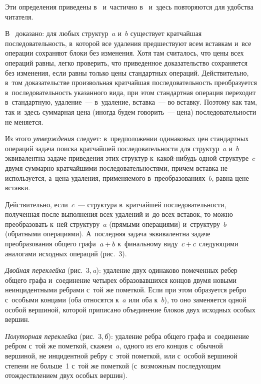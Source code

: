 \begin{multicols}{2}
  Эти определения приведены в~\cite{2-gor, 3-gor} и~частично в~\cite{6-gor} 
и~здесь повторяются для удобства читателя. 
  
  В~\cite{2-gor} доказано: для любых структур~$a$ и~$b$ существует 
кратчайшая последовательность, в~которой все удаления предшествуют всем 
вставкам и~все операции сохраняют блоки без изменения. Хотя там считалось, 
что цены всех операций равны, легко проверить, что приведенное 
доказательство сохраняется без изменения, если равны только цены\linebreak 
стандартных операций. Действительно, в~том доказательстве произвольная 
кратчайшая последовательность преобразуется в~последовательность 
указанного вида, при этом стандартная операция перехо\-дит в~стандартную, 
удаление~--- в~удаление, вставка~--- во вставку. Поэтому как там, так и~здесь 
суммарная цена (иногда будем говорить~--- цена) последовательности не 
меняется.


  
  Из этого \textit{утверждения} следует: в~предположении одинаковых цен 
стандартных операций задача поиска кратчайшей последовательности для 
структур~$a$ и~$b$ эквивалентна задаче приведения этих структур  
к~ка\-кой-ни\-будь одной структуре~$c$ двумя суммарно кратчайшими 
последовательностями, причем вставка не используется, а~цена удаления, 
применяемого в~преобразованиях~$b$, равна цене вставки. 

Действительно, 
если~$c$~--- структура в~кратчайшей последовательности, полученная после 
выполнения всех удалений и~до всех вставок, то можно преобразовать к~ней 
структуру~$a$ (прямыми операциями) и~структуру~$b$ (обратными 
операциями). А~последняя задача эквивалентна задаче преобразования общего 
графа~$a\hm+b$ к~финальному виду~$c\hm+c$ следующими аналогами 
исходных операций (рис.~3).
  

  
  \textit{Двойная переклейка} (рис.~3,\,\textit{a}): удаление двух одинаково 
помеченных ребер общего графа и~соединение четырех образовавшихся концов 
двумя новыми неинцидентными реб\-ра\-ми с~той же пометкой. Если при этом 
образуется ребро с~особыми концами (оба относятся к~$a$ или оба к~$b$), то 
оно заменяется одной особой вершиной, которой приписано объединение 
блоков двух исходных особых вершин. 

\textit{Полуторная переклейка}
(рис.~3,\,\textit{б}): удаление реб\-ра общего графа и~соединение ребром с~той же 
пометкой, скажем~$a$, одного из его концов с~обычной вершиной, не 
инцидентной ребру с~этой пометкой, или с~особой вершиной степени не 
больше~1 с~той же пометкой (с~возможным последующим отождествлением 
двух особых вершин). 


\end{multicols}
